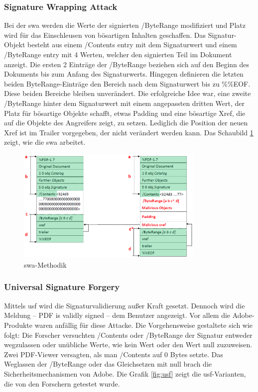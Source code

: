 \subsubsection{Signature Wrapping Attack}
Bei der \gls{swa} werden die Werte der signierten /ByteRange modifiziert und Platz wird für das Einschleusen von bösartigen Inhalten geschaffen. Das Signatur-Objekt besteht aus einem /Contents entry mit dem Signaturwert und einem /ByteRange entry mit 4 Werten, welcher den signierten Teil im Dokument anzeigt. Die ersten 2 Einträge der /ByteRange beziehen sich auf den Beginn des Dokuments bis zum Anfang des Signaturwerts. Hingegen definieren die letzten beiden ByteRange-Einträge den Bereich nach dem Signaturwert bis zu \%\%EOF. Diese beiden Bereiche bleiben unverändert. Die erfolgreiche Idee war, eine zweite /ByteRange hinter dem Signaturwert mit einem angepassten dritten Wert, der Platz für bösartige Objekte schafft, etwas Padding und eine bösartige Xref, die auf die Objekte des Angreifers zeigt, zu setzen. Lediglich die Position der neuen Xref ist im Trailer vorgegeben, der nicht verändert werden kann. Das Schaubild \ref{fig:swa} zeigt, wie die \gls{swa} arbeitet.

\begin{figure}[!htbp]
	\centering
	\includegraphics[width=0.8\textwidth]{"images/sig_wrap_attack.png"}
	\caption{\gls{swa}-Methodik \cite{ccc-break-pdf-slides}}
	\label{fig:swa}
\end{figure}

\subsubsection{Universal Signature Forgery}
Mittels \gls{usf} wird die Signaturvalidierung außer Kraft gesetzt. Dennoch wird die Meldung – PDF is validly signed – dem Benutzer angezeigt. Vor allem die Adobe-Produkte waren anfällig für diese Attacke. Die Vorgehensweise gestaltete sich wie folgt: Die Forscher versuchten /Contents oder /ByteRange der Signatur entweder wegzulassen oder unübliche Werte, wie kein Wert oder den Wert null zuzuweisen. Zwei PDF-Viewer versagten, als man /Contents auf 0 Bytes setzte. Das Weglassen der /ByteRange oder das Gleichsetzen mit null brach die Sicherheitsmechanismen von Adobe. Die Grafik \ref{fig:usf} zeigt die \gls{usf}-Varianten, die von den Forschern getestet wurde.

